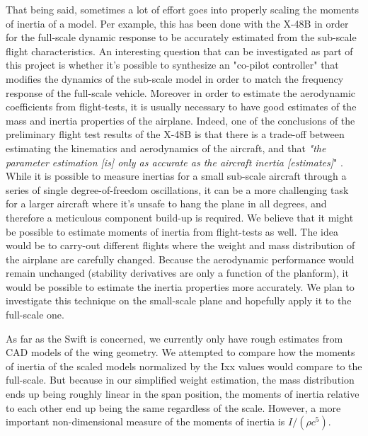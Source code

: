 \documentclass[titlepage,10pt]{article}
\begin{document}
That being said, sometimes a lot of effort goes into properly scaling the moments of inertia of a model. Per example, this has been done with the X-48B in order for the full-scale dynamic response to be accurately estimated from the sub-scale flight characteristics. An interesting question that can be investigated as part of this project is whether it's possible to synthesize an "co-pilot controller" that modifies the dynamics of the sub-scale model in order to match the frequency response of the full-scale vehicle. Moreover in order to estimate the aerodynamic coefficients from flight-tests, it is usually necessary to have good estimates of the mass and inertia properties of the airplane. Indeed, one of the conclusions of the preliminary flight test results of the X-48B is that there is a trade-off between estimating the kinematics and aerodynamics of the aircraft, and that \textit{"the parameter estimation [is] only as accurate as the aircraft inertia [estimates]}" \cite{X48B}.\\

While it is possible to measure inertias for a small sub-scale aircraft through a series of single degree-of-freedom oscillations, it can be a more challenging task for a larger aircraft where it's unsafe to hang the plane in all degrees, and therefore a meticulous component build-up is required. We believe that it might be possible to estimate moments of inertia from flight-tests as well. The idea would be to carry-out different flights where the weight and mass distribution of the airplane are carefully changed. Because the aerodynamic performance would remain unchanged (stability derivatives are only a function of the planform), it would be possible to estimate the inertia properties more accurately. We plan to investigate this technique on the small-scale plane and hopefully apply it to the full-scale one.\\
\enlargethispage{4 \baselineskip}

As far as the Swift is concerned, we currently only have rough estimates from CAD models of the wing geometry. We attempted to compare how the moments of inertia of the scaled models normalized by the Ixx values would compare to the full-scale. But because in our simplified weight estimation, the mass distribution ends up being roughly linear in the span position, the moments of inertia relative to each other end up being the same regardless of the scale. However, a more important non-dimensional measure of the moments of inertia is $I/(\rho c^5)$. 
\newpage
\end{document}
